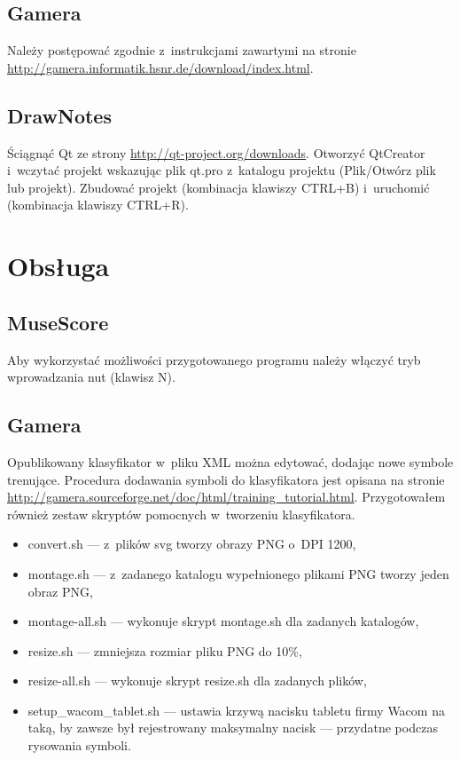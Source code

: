 \documentclass[polish,thesis,12pt]{dcsbook}
\begin{document}
\subsection{Gamera}
Należy postępować zgodnie z~instrukcjami zawartymi na stronie \url{http://gamera.informatik.hsnr.de/download/index.html}.

\subsection{DrawNotes}
Ściągnąć Qt ze strony \url{http://qt-project.org/downloads}. Otworzyć QtCreator i~wczytać projekt wskazując plik qt.pro z~katalogu projektu (Plik/Otwórz plik lub projekt). Zbudować projekt (kombinacja klawiszy CTRL+B) i~uruchomić (kombinacja klawiszy CTRL+R).

\section{Obsługa}
\subsection{MuseScore}
Aby wykorzystać możliwości przygotowanego programu należy włączyć tryb wprowadzania nut (klawisz N).

\subsection{Gamera}
Opublikowany klasyfikator w~pliku XML można edytować, dodając nowe symbole trenujące. Procedura dodawania symboli do klasyfikatora jest opisana na stronie \url{http://gamera.sourceforge.net/doc/html/training_tutorial.html}. Przygotowałem również zestaw skryptów pomocnych w~tworzeniu klasyfikatora.

\begin{itemize}
  \item convert.sh --- z~plików svg tworzy obrazy PNG o~DPI 1200,
  \item montage.sh --- z~zadanego katalogu wypełnionego plikami PNG tworzy jeden obraz PNG,
  \item montage-all.sh --- wykonuje skrypt montage.sh dla zadanych katalogów,
  \item resize.sh --- zmniejsza rozmiar pliku PNG do 10\%,
  \item resize-all.sh --- wykonuje skrypt resize.sh dla zadanych plików,
  \item setup\_wacom\_tablet.sh --- ustawia krzywą nacisku tabletu firmy Wacom na taką, by zawsze był rejestrowany maksymalny nacisk --- przydatne podczas rysowania symboli.
\end{itemize}
\end{document}
